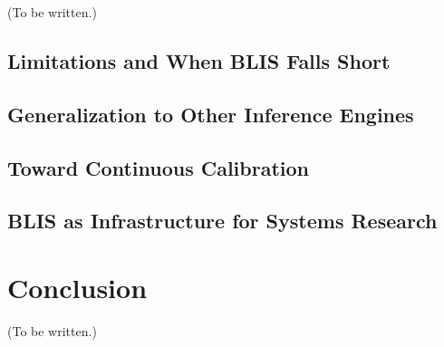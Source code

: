 \documentclass[11pt]{article}
\theoremstyle{plain} %
\theoremstyle{definition} %
\theoremstyle{remark} %
\numberwithin{equation}{section}
\begin{document}
(To be written.)

\subsection{Limitations and When BLIS Falls Short}
\label{subsec:discuss-limitations}
\subsection{Generalization to Other Inference Engines}
\label{subsec:discuss-generalization}
\subsection{Toward Continuous Calibration}
\label{subsec:discuss-continuous}
\subsection{BLIS as Infrastructure for Systems Research}
\label{subsec:discuss-research}

\section{Conclusion}
\label{sec:conclusion}

(To be written.)
\end{document}
